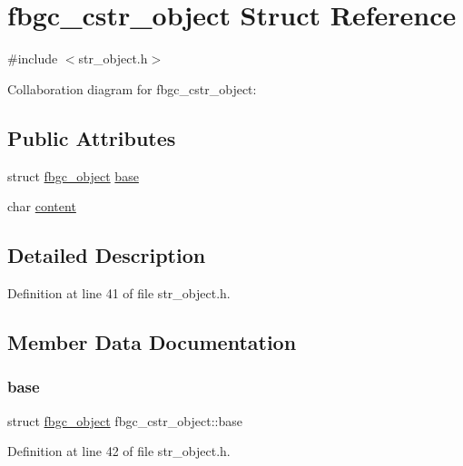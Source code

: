 \hypertarget{structfbgc__cstr__object}{}\section{fbgc\+\_\+cstr\+\_\+object Struct Reference}
\label{structfbgc__cstr__object}


{\ttfamily \#include $<$str\+\_\+object.\+h$>$}



Collaboration diagram for fbgc\+\_\+cstr\+\_\+object\+:
\subsection*{Public Attributes}
\begin{DoxyCompactItemize}
\item 
struct \hyperlink{structfbgc__object}{fbgc\+\_\+object} \hyperlink{structfbgc__cstr__object_a16d1044899e3196b30196fb3e73fa27d}{base}
\item 
char \hyperlink{structfbgc__cstr__object_adb7a9cca68a974eaac8afc50922db473}{content}
\end{DoxyCompactItemize}


\subsection{Detailed Description}


Definition at line 41 of file str\+\_\+object.\+h.



\subsection{Member Data Documentation}
\mbox{\label{structfbgc__cstr__object_a16d1044899e3196b30196fb3e73fa27d}} 
\subsubsection{\texorpdfstring{base}{base}}
{\footnotesize\ttfamily struct \hyperlink{structfbgc__object}{fbgc\+\_\+object} fbgc\+\_\+cstr\+\_\+object\+::base}



Definition at line 42 of file str\+\_\+object.\+h.

